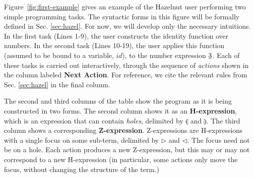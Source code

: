 
%
Figure~\ref{fig:first-example} gives an example of the Hazelnut user
performing two simple programming tasks.
The syntactic forms in this figure will be formally defined in Sec. \ref{sec:hazel}. For now, we will develop only the necessary intuitions. In the first task (Lines 1-9), the user constructs the identity function over numbers. In the second task (Lines 10-19), the user applies this function (assumed to be bound to a variable, $id$), to the number expression $\underline{3}$.
Each of these tasks is carried out interactively, through the sequence of \emph{actions} shown in the  column labeled \textbf{Next Action}. For reference, we cite the relevant rules from Sec. \ref{sec:hazel} in the final column.

The second and third columns of the
table show the program as it is being constructed in two forms. The second column shows it as an \textbf{H-expression}, which is an expression that can contain \emph{holes}, delimited by $\llparenthesis$ and $\rrparenthesis$. The third column shows a corresponding \textbf{Z-expression}. Z-expressions are H-expressions with a single focus on some sub-term, delimited by $\triangleright$ and $\triangleleft$. The focus need not be on a hole.
Each action produces a new Z-expression, but this may or may not correspond to a new H-expression (in particular, some actions only move the focus, without changing the structure of the term.)


